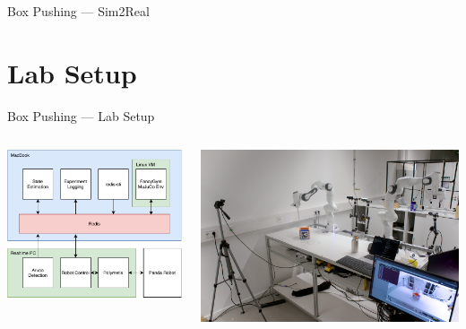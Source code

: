 \documentclass[16:9,en,navbarinfooter]{sdqbeamer}
\begin{document}
\begin{frame}{Box Pushing --- Sim2Real}
\end{frame}

\section{Lab Setup}
\begin{frame}{Box Pushing --- Lab Setup}
    \begin{columns}
    \begin{column}{0.45\textwidth}
    \vspace{1cm}
\includegraphics[width=\linewidth]{media/Architecture.pdf}

    \end{column}
    \begin{column}{0.45\textwidth}
    \vspace{1cm}
\includegraphics[width=\linewidth]{media/labsetup2.jpg}

    \end{column}
    \end{columns}

\end{frame}
\end{document}
